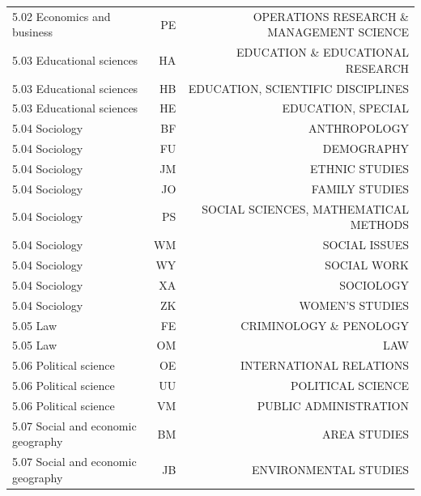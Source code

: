\documentclass[12pt, a4paper]{article}
\begin{document}
\begin{table}[H]
\begin{adjustbox}{center}
\begin{tabular}{l|rr}
			5.02 Economics and business        & PE & OPERATIONS RESEARCH \& MANAGEMENT SCIENCE \\
			5.03 Educational sciences          & HA & EDUCATION \& EDUCATIONAL RESEARCH         \\
			5.03 Educational sciences          & HB & EDUCATION, SCIENTIFIC DISCIPLINES         \\
			5.03 Educational sciences          & HE & EDUCATION, SPECIAL                        \\
			5.04 Sociology                     & BF & ANTHROPOLOGY                              \\
			5.04 Sociology                     & FU & DEMOGRAPHY                                \\
			5.04 Sociology                     & JM & ETHNIC STUDIES                            \\
			5.04 Sociology                     & JO & FAMILY STUDIES                            \\
			5.04 Sociology                     & PS & SOCIAL SCIENCES, MATHEMATICAL METHODS     \\
			5.04 Sociology                     & WM & SOCIAL ISSUES                             \\
			5.04 Sociology                     & WY & SOCIAL WORK                               \\
			5.04 Sociology                     & XA & SOCIOLOGY                                 \\
			5.04 Sociology                     & ZK & WOMEN'S STUDIES                           \\
			5.05 Law                           & FE & CRIMINOLOGY \& PENOLOGY                   \\
			5.05 Law                           & OM & LAW                                       \\
			5.06 Political science             & OE & INTERNATIONAL RELATIONS                   \\
			5.06 Political science             & UU & POLITICAL SCIENCE                         \\
			5.06 Political science             & VM & PUBLIC ADMINISTRATION                     \\
			5.07 Social and economic geography & BM & AREA STUDIES                              \\
			5.07 Social and economic geography & JB & ENVIRONMENTAL STUDIES                     \\

\end{tabular}
\end{adjustbox}
\end{table}
\end{document}
